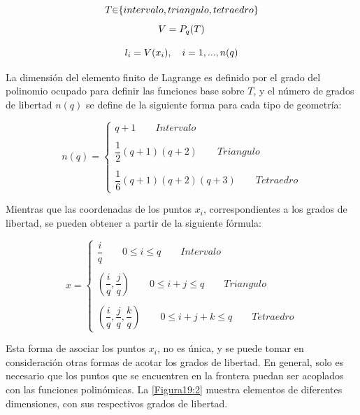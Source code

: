 \begin{equation}
\label{eqn:fe26}
    \\T{\in}\{intervalo,triangulo,tetraedro\}
\end{equation}
\begin{equation}
\label{eqn:fe27}
\\V=P_{q}(T)
\end{equation}

\begin{equation}
\label{eqn:fe28}
    \\ l_{i}=V(x_{i}),\quad i=1,...,n(q)
\end{equation}

La dimensión del elemento finito de Lagrange es definido por el grado del polinomio ocupado para definir las funciones base sobre $T$, y el número de grados de libertad $n(q)$ se define de la siguiente forma para cada tipo de geometría:

\begin{equation}
\label{eqn:fe29}
    n(q)= \left\{ \begin{array}{lcc}
             q+1 \qquad  Intervalo  \\
             \\ \dfrac{1}{2}(q+1)(q+2) \qquad Triangulo  \\
             \\ \dfrac{1}{6}(q+1)(q+2)(q+3)  \qquad Tetraedro 
             \end{array}
   \right.
\end{equation}

Mientras que las coordenadas de los puntos $x_{i}$, correspondientes a los grados de libertad, se pueden obtener a partir de la siguiente fórmula:

\begin{equation}
\label{eqn:fe30}
     x= \left\{ \begin{array}{lcc}
             \dfrac{i}{q} \qquad 0{\le}i{\le}q \qquad Intervalo  \\
             \\ (\dfrac{i}{q},\dfrac{j}{q})  \qquad 0{\le}i+j{\le}q \qquad Triangulo  \\
             \\ (\dfrac{i}{q},\dfrac{j}{q},\dfrac{k}{q})  \qquad 0{\le}i+j+k{\le}q \qquad Tetraedro 
             \end{array}
   \right.
\end{equation}

Esta forma de asociar los puntos $x_{i}$, no es única, y se puede tomar en consideración otras formas de acotar los grados de libertad. En general, solo es necesario que los puntos que se encuentren en la frontera puedan ser acoplados con las funciones polinómicas. La \ref{Figura19:2} muestra elementos de diferentes dimensiones, con sus respectivos grados de libertad.
\\

